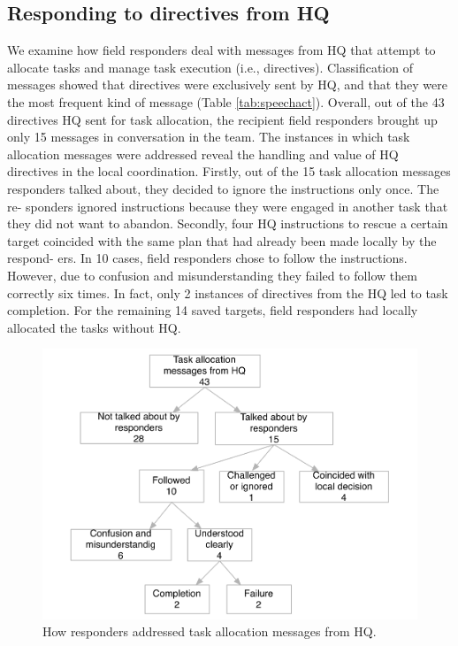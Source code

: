 \subsection{Responding to directives from HQ}\label{sec:study1directives}

We examine how field responders deal with messages from HQ that attempt to allocate tasks and manage task execution (i.e., directives). Classification of messages showed that directives were exclusively sent by HQ, and that they were the most frequent kind of message (Table \ref{tab:speechact}). Overall, out of the 43 directives HQ sent for task allocation, the recipient field responders brought up only 15 messages in conversation in the team. The instances in which task allocation messages were addressed reveal the handling and value of HQ directives in the local coordination. Firstly, out of the 15 task allocation messages responders talked about, they decided to ignore the instructions only once. The re- sponders ignored instructions because they were engaged in another task that they did not want to abandon. Secondly, four HQ instructions to rescue a certain target coincided with the same plan that had already been made locally by the respond- ers. In 10 cases, field responders chose to follow the instructions. However, due to confusion and misunderstanding they failed to follow them correctly six times. In fact, only 2 instances of directives from the HQ led to task completion. For the remaining 14 saved targets, field responders had locally allocated the tasks without HQ.\\

\begin{figure}[h]
  \centering
  \includegraphics[width=1\textwidth]{img/study1/instructions}
  \caption{How responders addressed task allocation messages from HQ.}
  \label{fig:intructions}
\end{figure}


